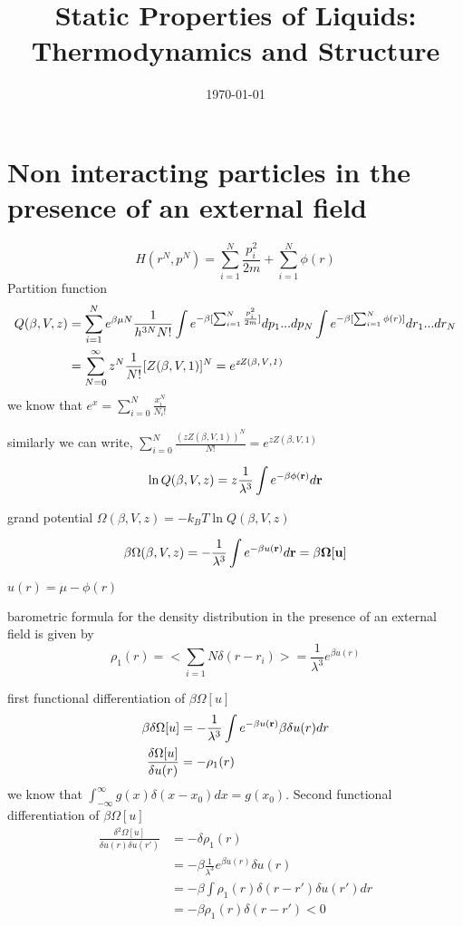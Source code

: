 \documentclass[a4paper]{article}
\title{Static Properties of Liquids: Thermodynamics and Structure}
\date{\today}
\begin{document}
\maketitle
\section{Non interacting particles in the presence of an external field}
\begin{equation}
	H(r^N,p^N) = \sum_{i=1}^{N} \frac{p_i^2}{2m} + \sum_{i=1}^{N} \phi(r)
\end{equation}
Partition function
\begin{align}
	Q(\beta,V,z)& = \sum_{i=1}^{N} e^{\beta \mu N} \frac{1}{h^{3N}N!} \int e^{-\beta [\sum_{i=1}^{N} \frac{p_i^2}{2m}]} dp_1...dp_N  \int e^{-\beta [\sum_{i=1}^{N} \phi(r)]} dr_1...dr_N\\
	&= \sum_{N = 0 }^{\infty} z^N \frac{1}{N!} [Z(\beta,V,1)]^N = e^{\it{z} Z(\beta,V,1)}
\end{align}
we know that $e^x = \sum_{i = 0}^{N} \frac{x_i^N}{N_i!}$


similarly we can write,
$\sum_{i=0}^{N} \frac{(z Z(\beta,V,1))^N}{N!} = e^{z Z(\beta,V,1)}$

\begin{equation}
	\ln Q (\beta,V,z) = z\frac{1}{\lambda^3}\int  e^{-\beta\phi(\bf{r})} d\bf{r}
\end{equation}

grand potential $\Omega(\beta,V,z) = -k_BT \ln Q(\beta,V,z)$

\begin{equation}
	\beta \Omega(\beta,V,z) = -\frac{1}{\lambda^3}\int e^{-\beta u(\bf{r})} d\bf{r}= \beta \Omega[u]
\end{equation}

$u(r) = \mu - \phi(r)$

barometric formula for the density distribution in the presence of an external field is given by
\begin{equation}
	\rho_1(r) = \big< \sum_{i=1}{N}\delta(r-r_i) \big> = \frac{1}{\lambda^3}e^{\beta u(r)}
\end{equation}

first functional differentiation of $ \beta \Omega[u]$
\begin{align}
	\beta \delta \Omega[u] &= -\frac{1}{\lambda^3}\int e^{-\beta u(\bf{r})}\beta\delta u(r) dr\\
	\frac{\delta \Omega[u]}{\delta u(r)} &= -\rho_1(r)
\end{align}
we know that $\int_{-\infty}^{\infty} g(x) \delta(x-x_0) dx = g(x_0)$. Second functional differentiation of $ \beta \Omega[u]$
\begin{align}
	\frac{\delta^2 \Omega[u]}{\delta u(r) \delta u(r')} &= -\delta\rho_1(r)\\
	&= -\beta \frac{1}{\lambda^3} e^{\beta u(r)} \delta u(r)\\
	&= -\beta \int \rho_1(r)\delta(r-r')\delta u(r') dr\\
	&= -\beta \rho_1(r)\delta(r-r') < 0
\end{align}
\end{document}
